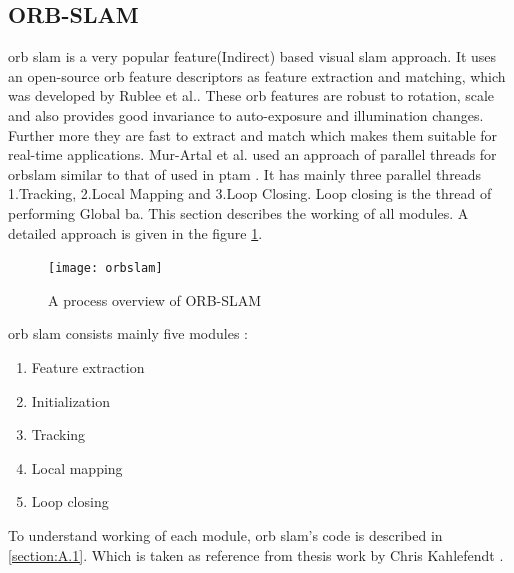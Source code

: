 \subsection{ORB-SLAM}
\acrshort{orb} \acrshort{slam} is a very popular feature(Indirect) based visual \acrshort{slam} approach. It uses an open-source \acrshort{orb} feature descriptors as feature extraction and matching, which was developed by Rublee et al.\cite{ORB}. These \acrshort{orb} features are robust to rotation, scale and also provides good invariance to auto-exposure and illumination changes. Further more they are fast to extract and match which makes them suitable for real-time applications\cite{Mur-Artal}. Mur-Artal et al. \cite{Mur-Artal} used an approach of parallel threads for \acrshort{orb}\acrshort{slam} similar to that of used in \acrshort{ptam} \cite{4538852}. It has mainly three parallel threads 1.Tracking, 2.Local Mapping and 3.Loop Closing. Loop closing is the thread of performing Global \acrshort{ba}. This section describes the working of all modules. A detailed approach is given in the figure \ref{fig:orbslam}.
\begin{figure}[h]
	\centering
	\texttt{[image: orbslam]}
	\caption{A process overview of ORB-SLAM \cite{Mur-Artal}}
	\label{fig:orbslam}
\end{figure}
\newline
\acrshort{orb} \acrshort{slam} consists mainly five modules :
\begin{enumerate}
	\item Feature extraction 
	\item Initialization
	\item Tracking
	\item Local mapping
	\item Loop closing
\end{enumerate}	
To understand working of each module, \acrshort{orb} \acrshort{slam}'s code is described in \ref{section:A.1}. Which is taken as reference from thesis work by Chris Kahlefendt \cite{chris}.

